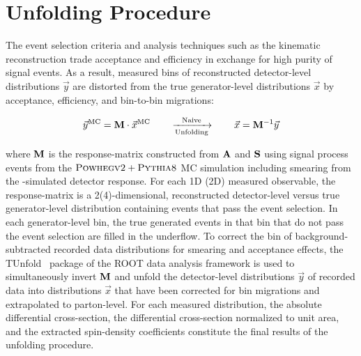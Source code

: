 \section{Unfolding Procedure}
The event selection criteria and analysis techniques such as the \ttbar kinematic reconstruction trade acceptance and efficiency in exchange for high purity of signal events.
As a result, measured bins of reconstructed detector-level distributions $\vec{y}$ are distorted from the true generator-level distributions $\vec{x}$ by acceptance, efficiency, and bin-to-bin migrations:
\begin{linenomath*}
\begin{align}
\vec{y}^{\text{MC}} = \mathbf{M} \cdot \vec{x}^{\text{MC}} \quad \quad \xrightarrow[\text{Unfolding}]{\text{Naive}} \quad \quad \vec{x} = \mathbf{M}^{-1} \vec{y}
\end{align}
\end{linenomath*}
where $\mathbf{M}$ is the response-matrix constructed from $\mathbf{A}$ and $\mathbf{S}$ using signal process events from the ${\textsc{Powhegv2}} + {\textsc{Pythia8}}$ MC simulation including smearing from the \Geant-simulated detector response.
For each 1D (2D) measured observable, the response-matrix is a 2(4)-dimensional, reconstructed detector-level versus true generator-level distribution containing events that pass the event selection.
In each generator-level bin, the true generated events in that bin that do not pass the event selection are filled in the underflow.
To correct the bin of background-subtracted recorded data distributions for smearing and acceptance effects, the TUnfold~\cite{TUnfold} package of the ROOT data analysis framework is used to simultaneously invert $\mathbf{M}$ and unfold the detector-level distributions $\vec{y}$ of recorded data into distributions $\vec{x}$ that have been corrected for bin migrations and extrapolated to parton-level.
For each measured distribution, the absolute differential cross-section, the differential cross-section normalized to unit area, and the extracted spin-density coefficients constitute the final results of the unfolding procedure.



